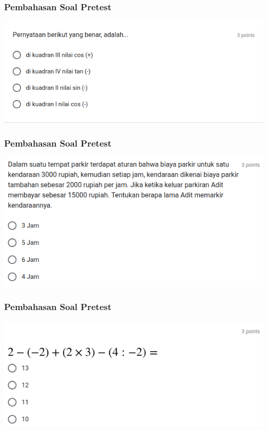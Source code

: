 \documentclass[pdflatex,compress,mathserif]{beamer}
\begin{document}
	\begin{frame}
		\frametitle{Pembahasan Soal Pretest}
		\begin{center}
			\includegraphics[width=\linewidth]{img/img31}
		\end{center}
	\end{frame}
	
	\begin{frame}
		\frametitle{Pembahasan Soal Pretest}
		\begin{center}
			\includegraphics[width=\linewidth]{img/img32}
		\end{center}
	\end{frame}
	
	\begin{frame}
		\frametitle{Pembahasan Soal Pretest}
		\begin{center}
			\includegraphics[width=\linewidth]{img/img33}
		\end{center}
	\end{frame}
	
	
\end{document}
